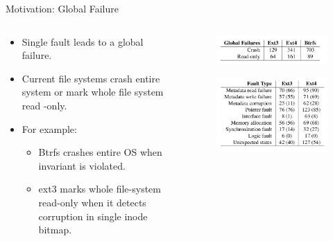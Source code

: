 \documentclass[aspectratio=169]{beamer}
\newcommand{\bi}{\begin{itemize}}
\newcommand{\ei}{\end{itemize}}
\begin{document}
\begin{frame}{Motivation: Global Failure}
    \begin{columns}[T]
        \begin{column}{0.5\textwidth}
        \bi
    \item Single fault leads to a global failure.
    \item Current file systems crash entire system or mark whole file system read
        -only.
    \item For example:
        \bi
    \item Btrfs crashes entire OS when invariant is violated.
    \item ext3 marks whole file-system read-only when it detects corruption in
        single inode bitmap.
        \ei
        \ei
\end{column}
\hspace{-2cm}\begin{column}{0.2\textwidth}
    \pause
    \begin{figure}\flushleft
        \includegraphics[scale=0.3]{./figures/table1.png}
    \end{figure}
    \pause
    \begin{figure}\flushleft
        \includegraphics[scale=0.3]{./figures/table2.png}
    \end{figure}
\end{column}
\end{columns}
\end{frame}
\end{document}
